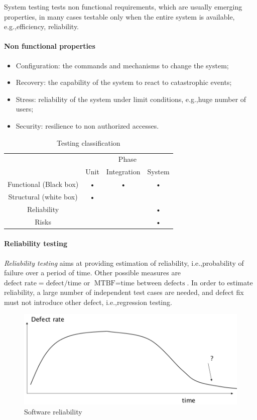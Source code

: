 \medskip

System testing tests non functional requirements, which are usually emerging properties, in many cases testable only when the entire system is available, e.g.,\@ efficiency, reliability.

\paragraph{Non functional properties}
\begin{itemize}
\item Configuration: the commands and mechanisms to change the system;
\item Recovery: the capability of the system to react to catastrophic events;
\item Stress: reliability of the system under limit conditions, e.g.,\@ huge number of users;
\item Security: resilience to non authorized accesses.
\end{itemize}

\begin{table}
\centering
\begin{tabular}{|c|c|c|c|}
\hline 
 & \multicolumn{3}{c|}{Phase} \\ 
\cline{2-4} 
 & Unit & Integration & System \\ 
\hline 
Functional (Black box) & • & • & • \\ 
\hline 
Structural (white box) & • & & \\ 
\hline 
Reliability & & & • \\ 
\hline 
Risks & & & • \\ 
\hline 
\end{tabular} 
\caption{Testing classification}
\end{table}

\paragraph{Reliability testing}
\emph{Reliability testing} aims at providing estimation of reliability, i.e.,\@ probability of failure over a period of time. Other possible measures are $\text{defect rate} = \text{defect}/\text{time}$ or $\text{MTBF} = \text{time between defects}$. In order to estimate reliability, a large number of independent test cases are needed, and defect fix must not introduce other defect, i.e.,\@ regression testing.

\begin{figure}[hbtp]
\centering
\includegraphics[scale=0.4]{images/software_reliability.png}
\caption{Software reliability}
\end{figure}

